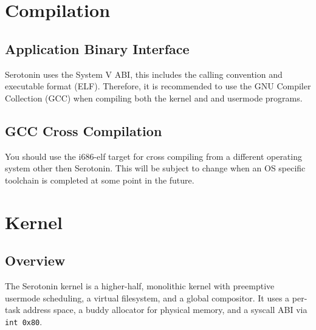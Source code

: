 \documentclass[11pt,a4paper]{article}
\begin{document}
\section{Compilation}
\subsection{Application Binary Interface}
Serotonin uses the System V ABI, this includes the calling convention and executable format (ELF). Therefore, it is recommended to use the GNU Compiler Collection (GCC) when compiling both the kernel and and usermode programs.

\subsection{GCC Cross Compilation}
You should use the i686-elf target for cross compiling from a different operating system other then Serotonin. This will be subject to change when an OS specific toolchain is completed at some point in the future.

\section{Kernel}
\subsection{Overview}
The Serotonin kernel is a higher-half, monolithic kernel with preemptive usermode scheduling, a virtual filesystem, and a global compositor. It uses a per-task address space, a buddy allocator for physical memory, and a syscall ABI via \texttt{int 0x80}.
\end{document}
